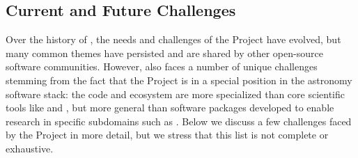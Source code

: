 \documentclass[modern]{aastex631}
\begin{document}
\subsection{Current and Future Challenges}

Over the history of \astropy, the needs and challenges of the \astropy Project
have evolved, but many common themes have persisted and are shared by other
open-source software communities.
However, \astropy also faces a number of unique challenges stemming from the
fact that the Project is in a special position in the astronomy software stack:
the \astropy code and ecosystem are more specialized than core scientific tools
like  and , but more general than software
packages developed to enable research in specific subdomains such as
 \citep{exoplanet:2021}.
Below we discuss a few challenges faced by the Project in more detail, but we
stress that this list is not complete or exhaustive.
\end{document}
